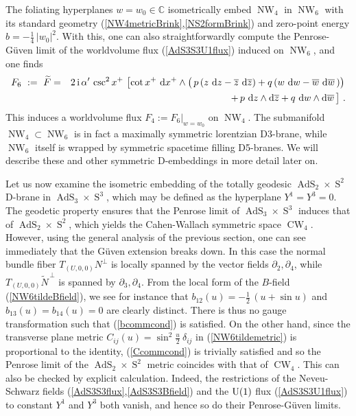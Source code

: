 \documentclass[11pt,a4paper]{article}
\DeclareMathOperator{\AdS}{AdS}
\DeclareMathOperator{\Sphere}{S}
\DeclareMathOperator{\NW}{NW}
\DeclareMathOperator{\CW}{CW}
\let\S\Sphere
\newcommand{\ii}{{\rm i}}
\def\ii{{\,{\rm i}\,}}
\def\dd{{\rm d}}
\newcommand{\complex}{{\mathbb C}} %
\def\nn{\nonumber}
\def\eea{\end{eqnarray}}
\newcommand{\beq}{\begin{eqnarray}}
\begin{document}
The foliating hyperplanes $w=w_0\in\complex$ isometrically embed
$\NW_4$ in $\NW_6$ with its standard geometry
(\ref{NW4metricBrink},\ref{NS2formBrink}) and zero-point energy
$b=-\frac14\,|w_0|^2$. With this, one can also
straightforwardly compute the Penrose-G\"uven limit of the worldvolume flux
(\ref{AdS3S3U1flux}) induced on $\NW_6$, and one finds
\beq
F_6~:=~\widetilde{F}&=&2\ii\alpha'\,
\csc^2x^+\,\left[\cot x^+~\dd x^+\wedge\bigl(\,p\,(z~\dd z-\overline{z}~
\dd\overline{z})+q\,(w~\dd w-\overline{w}~\dd\overline{w}\,)\bigr)
\right.\nn\\&&\bigl.+\,p~
\dd z\wedge\dd\overline{z}+q~\dd w\wedge\dd\overline{w}\,\bigr] \ .
\label{NW6flux}\eea
This induces a worldvolume flux $F_4:=F_6|_{w=w_0}$
on $\NW_4$. The submanifold $\NW_4\subset\NW_6$ is in fact a maximally
symmetric lorentzian D3-brane, while $\NW_6$ itself is wrapped by
symmetric spacetime filling D5-branes. We will describe these and
other symmetric D-embeddings in more detail later on.

Let us now examine the isometric embedding of the totally geodesic
$\AdS_2\times\S^2$ D-brane in $\AdS_3\times\S^3$, which may be
defined as the hyperplane $Y^1=Y^3=0$. The geodetic property
ensures that the Penrose limit of $\AdS_3\times\S^3$ induces that of
$\AdS_2\times\S^2$, which yields the Cahen-Wallach symmetric space
$\CW_4$. However, using the general analysis of the
previous section, one can see immediately that the G\"uven extension
breaks down. In this case the normal bundle fiber
$T_{(U,0,0)}N^\perp$ is locally spanned by the vector fields
$\partial_2,\partial_4$, while $T_{(U,0,0)}\widetilde{N}^{\,\perp}$ is
spanned by $\partial_3,\partial_4$. From the local form of the
$B$-field (\ref{NW6tildeBfield}), we see for instance that
$b_{12}(u)=-\frac12\,(u+\sin u)$ and $b_{13}(u)=b_{14}(u)=0$ are
clearly distinct. There is thus no gauge transformation such that
(\ref{bcommcond}) is satisfied. On the other hand, since the
transverse plane metric $C_{ij}(u)=\sin^2\frac u2~\delta_{ij}$
in (\ref{NW6tildemetric}) is proportional to the identity,
(\ref{Ccommcond}) is trivially satisfied and so the Penrose limit of
the $\AdS_2\times\S^2$ metric coincides with that of $\CW_4$. This can
also be checked by explicit calculation. Indeed, the restrictions of
the Neveu-Schwarz fields (\ref{AdS3S3flux},\ref{AdS3S3Bfield}) and the
${\rm U}(1)$ flux (\ref{AdS3S3U1flux}) to constant $Y^1$ and $Y^3$
both vanish, and hence so do their Penrose-G\"uven limits.
\end{document}
